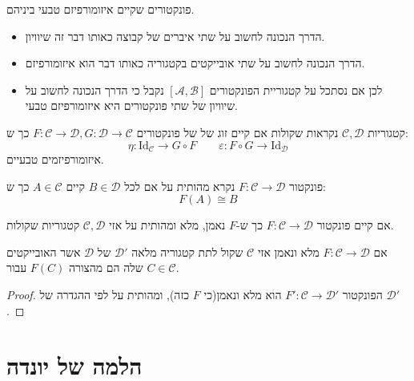 \documentclass{tstextbook}
\begin{document}
\begin{definition}
פונקטורים שקיים איזומורפיזם טבעי ביניהם.

\end{definition}
\begin{remark}
  \begin{itemize}
    \item הדרך הנכונה לחשוב על שתי איברים של קבוצה כאותו דבר זה שיוויון.
    \item הדרך הנכונה לחשוב על שתי אובייקטים בקטגוריה כאותו דבר הוא איזומורפיזם.
    \item לכן אם נסתכל על קטגוריית הפונקטורים \([\mathcal{A},\mathcal{B}]\) נקבל כי הדרך הנכונה לחשוב על שיוויון של שתי פונקטורים היא איזומורפיזם טבעי.
  \end{itemize}
\end{remark}
\begin{definition}
קטגוריות \(\mathcal{C},\mathcal{D}\) נקראות שקולות אם קיים זוג של של פונקטורים \(F:\mathcal{C}\to \mathcal{D},G:\mathcal{D}\to \mathcal{C}\) כך ש:
$$\eta:\mathrm{Id}_{\mathcal{C} }\to G\circ  F\qquad \varepsilon:F\circ G\to \mathrm{Id}_{\mathcal{D} }$$
איזומורפיזמים טבעיים.

\end{definition}
\begin{definition}
פונקטור \(F:\mathcal{C}\to \mathcal{D}\) נקרא מהותית על אם לכל \(B \in \mathcal{D}\) קיים \(A \in \mathcal{C}\) כך ש:
$$F(A)\cong  B$$

\end{definition}
\begin{proposition}
אם קיים פונקטור \(F:\mathcal{C}\to \mathcal{D}\) כך ש-\(F\) נאמן, מלא ומהותית על אזי \(\mathcal{C,D}\) קטגוריות שקולות.

\end{proposition}
\begin{corollary}
אם \(F:\mathcal{C}\to \mathcal{D}\) מלא ונאמן אזי \(\mathcal{C}\) שקול לתת קטגוריה מלאה \(\mathcal{D'}\) של \(\mathcal{D}\) אשר האובייקטים שלה הם מהצורה \(F(C)\) עבור \(C \in \mathcal{C}\).

\end{corollary}
\begin{proof}
הפונקטור \(F':\mathcal{C}\to \mathcal{D'}\) הוא מלא ונאמן(כי \(F\) כזה), ומהותית על לפי ההגדרה של \(\mathcal{D'}\).

\end{proof}
\chapter{הלמה של יונדה}
\end{document}
